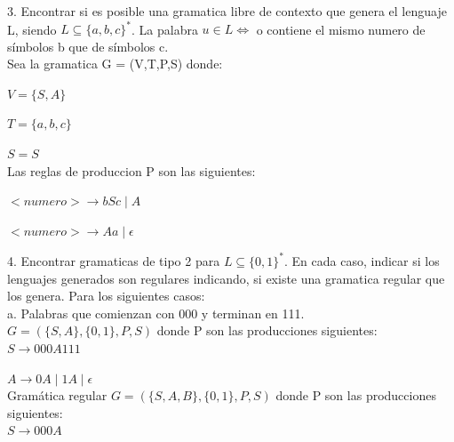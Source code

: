 \documentclass{article}
\begin{document}
3. Encontrar si es posible una gramatica libre de contexto que genera el lenguaje L, siendo $L\subseteq\{a,b,c\}^{*}$. La palabra $u \in L \Longleftrightarrow$ o contiene el mismo numero de símbolos b que de símbolos c.\\

  \hspace{1cm}Sea la gramatica G = (V,T,P,S) donde:

  \hspace{2cm}	$V = \{S,A\}$

  \hspace{2cm}	$T = \{a,b,c\}$

  \hspace{2cm}	$S = S$\\

  \hspace{2cm}	Las reglas de produccion P son las siguientes:
	
  \hspace{3cm}	$<numero> \rightarrow bSc \mid A$

  \hspace{3cm}	$<numero> \rightarrow Aa \mid \epsilon$

  \vspace{0,65cm}

4. Encontrar gramaticas de tipo 2 para $L\subseteq\{0,1\}^{*}$. En cada caso, indicar si los lenguajes generados son regulares indicando, si existe una gramatica regular que los genera. Para los siguientes casos:\\
  
\hspace{1cm}a. Palabras que comienzan con 000 y terminan en 111.\\

\hspace{2cm}$G = (\{S,A\},\{0,1\},P,S)$ donde P son las producciones siguientes:\\

\hspace{2cm}$S \rightarrow 000A111$

\hspace{2cm}$A \rightarrow 0A \mid 1A \mid \epsilon$\\

\hspace{2cm} Gramática regular $G = (\{S,A,B\},\{0,1\},P,S)$ donde P son las producciones siguientes:\\

\hspace{2cm}$S \rightarrow 000A$
\end{document}
